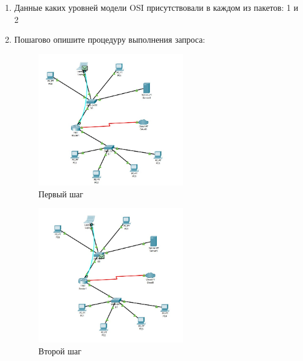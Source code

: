 \documentclass[bachelor, och, labwork]{shiza}
\begin{document}
\begin{enumerate}
\begin{enumerate}
        \item Данные каких уровней модели OSI присутствовали в каждом из пакетов: 1 и 2
        
        \item Пошагово опишите процедуру выполнения запроса:
        
        \begin{figure}[H]
            \centering      %
            \includegraphics[width=0.6\textwidth]{8}
            \caption{Первый шаг}
            \label{fig:image1}
        \end{figure}

        \begin{figure}[H]
            \centering      %
            \includegraphics[width=0.6\textwidth]{9}
            \caption{Второй шаг}
            \label{fig:image1}
        \end{figure}


\end{enumerate}
\end{enumerate}
\end{document}
